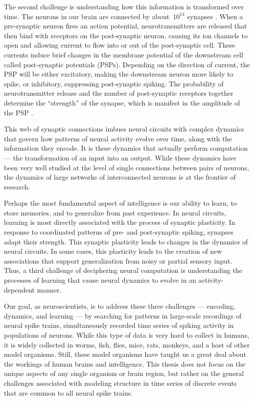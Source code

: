 The second challenge is understanding how this information is
transformed over time. The neurons in our brain are connected by
about~$10^{14}$ synapses \citep{kandel2000principles}. When a
pre-synaptic neuron fires an action potential, neurotransmitters are
released that then bind with receptors on the post-synaptic neuron,
causing its ion channels to open and allowing current to flow into or
out of the post-synaptic cell. These currents induce brief changes in
the membrane potential of the downstream cell called post-synaptic
potentials (PSPs). Depending on the direction of current, the PSP will
be either excitatory, making the downstream neuron more likely to
spike, or inhibitory, suppressing post-synaptic spiking. The 
probability of neurotransmitter release and the number of post-synaptic 
receptors together determine the ``strength'' of the synapse, 
which is manifest in the amplitude of the PSP \citep{cowan2003synapses}. 


This web of synaptic connections imbues neural circuits with complex
dynamics that govern how patterns of neural activity evolve over time,
along with the information they encode. It is these dynamics that actually
perform computation --- the transformation of an input into an output.
While these dynamics have been very well studied at the level of
single connections between pairs of neurons, the dynamics of large
networks of interconnected neurons is at the frontier of research.

Perhaps the most fundamental aspect of intelligence is our ability to
learn, to store memories, and to generalize from past experience.  In
neural circuits, learning is most directly associated with the process
of synaptic plasticity. In response to coordinated patterns of pre-
and post-synaptic spiking, synapses adapt their strength. This synaptic
plasticity leads to changes in the dynamics of neural circuits.  In
some cases, this plasticity leads to the creation of new associations
that support generalization from noisy or partial sensory input.
Thus, a third challenge of deciphering neural computation is
understanding the processes of learning that cause neural dynamics to
evolve in an activity-dependent manner.

Our goal, as neuroscientists, is to address these three challenges ---
encoding, dynamics, and learning --- by searching for patterns in
large-scale recordings of neural spike trains, simultaneously recorded
time series of spiking activity in populations of neurons. While this
type of data is very hard to collect in humans, it is widely collected
in worms, fish, flies, mice, rats, monkeys, and a host of other model
organisms.  Still, these model organisms have taught us a great deal
about the workings of human brains and intelligence.  This thesis does
not focus on the unique aspects of any single organism or brain
region, but rather on the general challenges associated with modeling
structure in time series of discrete events that are common to all
neural spike trains.


